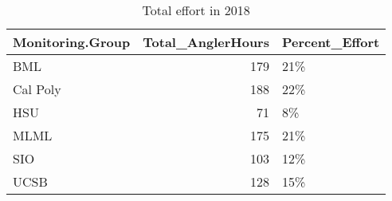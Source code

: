\documentclass[
]{article}
\begin{document}
\begin{table}

\caption{\label{tab:effort2018}Total effort in 2018}
\centering
\begin{tabular}[t]{lrl}
\toprule
Monitoring.Group & Total\_AnglerHours & Percent\_Effort\\
\midrule
BML & 179 & 21\%\\
Cal Poly & 188 & 22\%\\
HSU & 71 & 8\%\\
MLML & 175 & 21\%\\
SIO & 103 & 12\%\\
\addlinespace
UCSB & 128 & 15\%\\
\bottomrule
\end{tabular}
\end{table}
\end{document}
